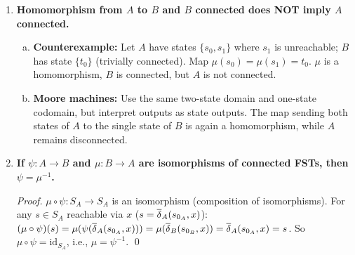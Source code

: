 \begin{enumerate}[{7.}1.]
\begin{enumerate}[(a)]
  \item \textbf{Mealy counterexample:}  Let $A$ have state $\{s_0\}$ (connected), $\Sigma=\{\pmb{a}\}$, $\delta_A(s_0,\pmb{a})=s_0$, $\omega_A(s_0,\pmb{a})=\pmb{0}$.  Let $B$ have states $\{t_0,t_1\}$ where $t_1$ is unreachable from $t_0$; $\delta_B(t_0,\pmb{a})=t_0$, $\omega_B(t_0,\pmb{a})=\pmb{0}$, $\delta_B(t_1,\pmb{a})=t_1$, $\omega_B(t_1,\pmb{a})=\pmb{0}$.  Map $\mu(s_0)=t_0$.  Then $\mu$ is a homomorphism, $A$ is connected, but $B$ is not connected ($t_1$ unreachable).

  \item \textbf{Moore machines:} Use the same state graph and the same map
  $\mu(s_0)=t_0$, but interpret outputs as state outputs rather than transition
  outputs.  Then $\mu$ is again a homomorphism from a connected machine onto a
  machine with an unreachable state.
\end{enumerate}

\item \textbf{Homomorphism from $A$ to $B$ and $B$ connected does NOT imply $A$ connected.}

\begin{enumerate}[(a)]
  \item \textbf{Counterexample:}  Let $A$ have states $\{s_0,s_1\}$ where $s_1$ is unreachable; $B$ has state $\{t_0\}$ (trivially connected).  Map $\mu(s_0)=\mu(s_1)=t_0$.  $\mu$ is a homomorphism, $B$ is connected, but $A$ is not connected.

  \item \textbf{Moore machines:} Use the same two-state domain and one-state
  codomain, but interpret outputs as state outputs.  The map sending both states
  of $A$ to the single state of $B$ is again a homomorphism, while $A$ remains
  disconnected.
\end{enumerate}

\item \textbf{If $\psi:A\to B$ and $\mu:B\to A$ are isomorphisms of connected FSTs, then $\psi=\mu^{-1}$.}

\begin{proof}
$\mu\circ\psi:S_A\to S_A$ is an isomorphism (composition of isomorphisms).  For any $s\in S_A$ reachable via $x$ ($s=\overline{\delta}_A(s_{0_A},x)$): $(\mu\circ\psi)(s)=\mu(\psi(\overline{\delta}_A(s_{0_A},x)))=\mu(\overline{\delta}_B(s_{0_B},x))=\overline{\delta}_A(s_{0_A},x)=s$.  So $\mu\circ\psi=\text{id}_{S_A}$, i.e., $\mu=\psi^{-1}$. \qed
\end{proof}


\end{enumerate}
